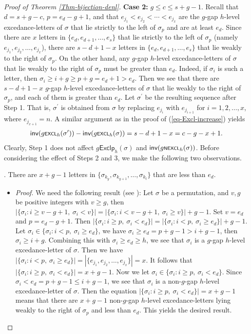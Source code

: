 \documentclass[12pt]{article}
\begin{document}
\begin{proof}[Proof of Theorem \ref{Thm-bijection-denl}]
\noindent \textbf{Case 2:} $g\leq c\leq s+g-1$. 	
Recall that $d=s+g-c$,  $p=e_{d}-g+1$, and that $e_{j_{1}}<e_{j_{2}}<\cdots<e_{j_{x}}$ are the $g$-gap $h$-level excedance-letters of $\sigma$ that lie strictly to the left of $\sigma_{p}$ and are at least $e_{d}$.
Since there are $x$ letters in $\{e_{d},e_{d+1},\ldots,e_{s}\}$ that lie strictly to the left of $\sigma_{p}$ 
(namely $e_{j_{1}},e_{j_{2}},\ldots,e_{j_{x}}$),
there are $s-d+1-x$ letters in $\{e_{d},e_{d+1},\ldots,e_{s}\}$ that lie weakly to the right of $\sigma_{p}$.
On the other hand, any $g$-gap $h$-level excedance-letters of $\sigma$ that lie weakly to the right of $\sigma_{p}$ must be greater than $e_{d}$.
Indeed, if $\sigma_{i}$ is such a letter, then $\sigma_{i}\geq i+g\geq p+g=e_{d}+1>e_{d}$.
Then we see that there are $s-d+1-x$ $g$-gap $h$-level excedance-letters of $\sigma$ that lie weakly to the right of $\sigma_{p}$, and each of them is greater than $e_{d}$.
Let $\sigma^{\prime}$ be the resulting sequence after Step 1.
That is, $\sigma^{\prime}$ is obtained from $\sigma$ by replacing $e_{j_{i}}$ with $e_{j_{i+1}}$ for $i=1,2,\ldots,x$, where $e_{j_{x+1}}=n$.
A similar argument as in the proof of (\ref{eq-Excl-increase}) yields
\begin{align*}
\textsf{inv}(g\textsf{\scriptsize{EXCL}}_{h}(\sigma^{\prime}))
-\textsf{inv}(g\textsf{\scriptsize{EXCL}}_{h}(\sigma))=s-d+1-x
=c-g-x+1.
\end{align*}
Clearly, Step 1 does not affect $g\textsf{Exclp}_{h}(\sigma)$ and $\textsf{inv}(g\textsf{\scriptsize{NEXCL}}_{h}(\sigma))$.
Before considering the effect of Steps 2 and 3, we make the following two observations.

. There are $x+g-1$ letters in $\{\sigma_{k_{y}},\sigma_{k_{y+1}},\ldots,\sigma_{k_{t}}\}$ that are less than $e_{d}$. 
\begin{itemize}[leftmargin=1.6em]
\item[]\emph{Proof}. 
We need the following result (see \cite{Liu-2024}):
Let $\sigma$ be a permutation, and $v,g$ be positive integers with  $v\geq g$,
then
$|\{\sigma_{i}:i\geq v-g+1,\!~\sigma_{i}<v\}|
=|\{\sigma_{i}:i<v-g+1,\!~\sigma_{i}\geq v\}|+g-1	
$.
Set $v=e_{d}$ and $p=e_{d}-g+1$. Then
$|\{\sigma_{i}:i\geq p,\!~\sigma_{i}<e_{d}\}|
=|\{\sigma_{i}:i<p,\!~\sigma_{i}\geq e_{d}\}|+g-1.$
Let $\sigma_{i}\in\{\sigma_{i}:i<p,\!~\sigma_{i}\geq e_{d}\}$,
we have $\sigma_{i}\geq e_{d}=p+g-1>i+g-1$,
then $\sigma_{i}\geq i+g$.
Combining this with $\sigma_{i}\geq e_{d}\geq h$,
we see that $\sigma_{i}$ is a $g$-gap $h$-level excedance-letter of $\sigma$.
Then we have $|\{\sigma_{i}:i<p,\!~\sigma_{i}\geq e_{d}\}|=|\{e_{j_{1}},e_{j_{2}},\ldots,e_{j_{x}}\}|=x$. 
It follows that $|\{\sigma_{i}:i\geq p,\!~\sigma_{i}<e_{d}\}|=x+g-1$.
Now we let $\sigma_{i}\in\{\sigma_{i}:i\geq p,\!~\sigma_{i}<e_{d}\}$.
Since $\sigma_{i}<e_{d}=p+g-1\leq i+g-1$,
we see that $\sigma_{i}$ is a non-$g$-gap $h$-level excedance-letter of $\sigma$.
Then the equation $|\{\sigma_{i}:i\geq p,\!~\sigma_{i}<e_{d}\}|=x+g-1$ means that there are $x+g-1$ non-$g$-gap $h$-level excedance-letters lying  weakly to the right of $\sigma_{p}$ and less than $e_{d}$. 
This yields the desired result.
\end{itemize}


\end{proof}
\end{document}
